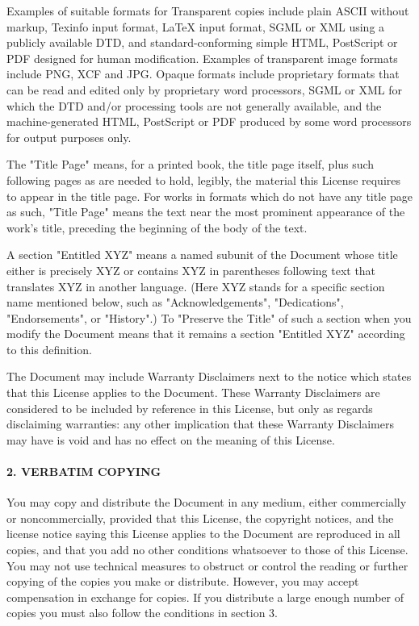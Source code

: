 \begin{multicols}{2}
{\footnotesize Examples of suitable formats for Transparent copies include plain ASCII without markup, Texinfo input format, \LaTeX{} input format, SGML or XML using a publicly available DTD, and standard-conforming simple HTML, PostScript or PDF designed for human modification. Examples of transparent image formats include PNG, XCF and JPG. Opaque formats include proprietary formats that can be read and edited only by proprietary word processors, SGML or XML for which the DTD and/or processing tools are not generally available, and the machine-generated HTML, PostScript or PDF produced by some word processors for output purposes only.}{\footnotesize \par}

{\footnotesize The "Title Page" means, for a printed book, the title page itself, plus such following pages as are needed to hold, legibly, the material this License requires to appear in the title page. For works in formats which do not have any title page as such, "Title Page" means the text near the most prominent appearance of the work's title, preceding the beginning of the body of the text.}{\footnotesize \par}

{\footnotesize A section "Entitled XYZ" means a named subunit of the Document whose title either is precisely XYZ or contains XYZ in parentheses following text that translates XYZ in another language. (Here XYZ stands for a specific section name mentioned below, such as "Acknowledgements", "Dedications", "Endorsements", or "History".) To "Preserve the Title" of such a section when you modify the Document means that it remains a section "Entitled XYZ" according to this definition.}{\footnotesize \par}

{\footnotesize The Document may include Warranty Disclaimers next to the notice which states that this License applies to the Document.  These Warranty Disclaimers are considered to be included by reference in this License, but only as regards disclaiming warranties: any other implication that these Warranty Disclaimers may have is void and has no effect on the meaning of this License.}{\footnotesize \par}


\paragraph{{\footnotesize 2. VERBATIM COPYING}}

{\footnotesize You may copy and distribute the Document in any medium, either commercially or noncommercially, provided that this License, the copyright notices, and the license notice saying this License applies to the Document are reproduced in all copies, and that you add no other conditions whatsoever to those of this License. You may not use technical measures to obstruct or control the reading or further copying of the copies you make or distribute. However, you may accept compensation in exchange for copies. If you distribute a large enough number of copies you must also follow the conditions in section 3.}{\footnotesize \par}


\end{multicols}
